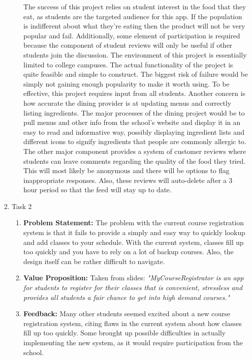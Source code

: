 \documentclass[11pt]{article}
\begin{document}
\begin{enumerate}
\begin{enumerate}
\indent The success of this project relies on student interest in the food that they eat, as students are the targeted audience for this app.  If the population is indifferent about what they're eating then the product will not be very popular and fail.  Additionally, some element of participation is required because the component of student reviews will only be useful if other students join the discussion.  The environment of this project is essentially limited to college campuses.  The actual functionality of the project is quite feasible and simple to construct.  The biggest risk of failure would be simply not gaining enough popularity to make it worth using.  To be effective, this project requires input from all students.  Another concern is how accurate the dining provider is at updating menus and correctly listing ingredients.  The major processes of the dining project would be to pull menus and other info from the school's website and display it in an easy to read and informative way, possibly displaying ingredient lists and different icons to signify ingredients that people are commonly allergic to.  The other major component provides a system of customer reviews where students can leave comments regarding the quality of the food they tried.  This will most likely be anonymous and there will be options to flag inappropriate responses.  Also, these reviews will auto-delete after a 3 hour period so that the feed will stay up to date.  

\end{enumerate}

\newpage

\item
Task 2

\begin{enumerate}[1]
\item
\textbf{Problem Statement:}
The problem with the current course registration system is that it fails to provide a simply and easy way to quickly lookup and add classes to your schedule.  With the current system, classes fill up too quickly and you have to rely on a lot of backup courses.  Also, the design itself can be rather difficult to navigate.  

\item
\textbf{Value Proposition:}
Taken from slides: \textit{"MyCourseRegistrator is an app for students to register for their classes that is convenient, stressless and provides all students a fair chance to get into high demand courses."}

\item
\textbf{Feedback:}
Many other students seemed excited about a new course registration system, citing flaws in the current system about how classes fill up too quickly.  Some brought up possible difficulties in actually implementing the new system, as it would require participation from the school.  


\end{enumerate}
\end{enumerate}
\end{document}
